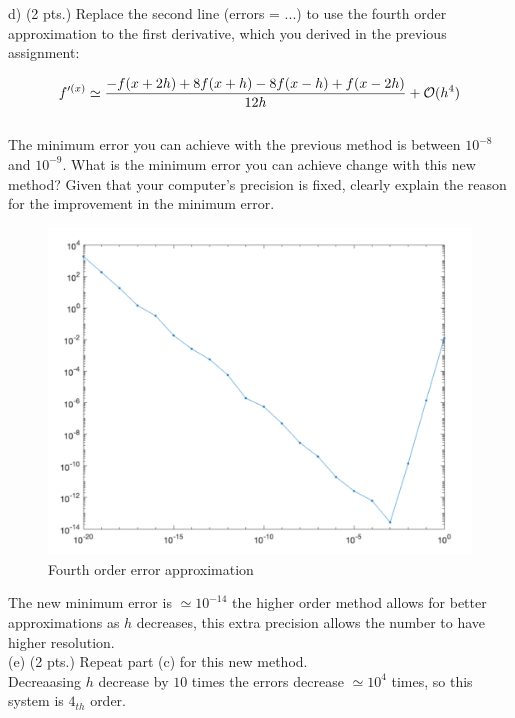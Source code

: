 \documentclass{article}
\begin{document}
\noindent
d) (2 pts.) Replace the second line (errors = ...) to use the fourth order approximation to the first derivative, which you derived in the previous assignment:

\begin{gather*}
  f^{\prime(x)} \simeq \frac{-f(x+2h) + 8f(x+h) - 8f(x-h) + f(x - 2h)}{12h} + \mathcal{O}(h^{4})
\end{gather*}\\

\noindent
The minimum error you can achieve with the previous method is between $10^{-8}$ and $10^{-9}$. What is the minimum error you can achieve change with this new method? Given that your computer’s precision is fixed, clearly explain the reason for the improvement in the minimum error.\\

\begin{figure}[H]
  \includegraphics[width=\linewidth]{docs/error-graph.pdf}
  \caption{Fourth order error approximation}
\end{figure}

\noindent
The new minimum error is $\simeq 10^{-14}$ the higher order method allows for better approximations as $h$ decreases, this extra precision allows the number to have higher resolution.\\

\noindent
(e) (2 pts.) Repeat part (c) for this new method.\\

\noindent
Decreaasing $h$ decrease by $10$ times the errors decrease $ \simeq 10^{4}$ times, so this system is $4_{th}$ order.
\end{document}
